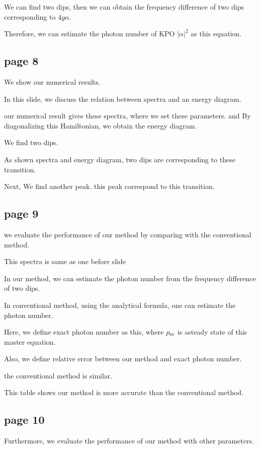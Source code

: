 {{We can find two dips, then we can obtain the frequency difference of two dips corresponding to $4g\alpha$.

Therefore, we can estimate the photon number of KPO $|\alpha|^2$ as this equation.



\subsection{page 8}
We show our numerical results.

In this slide, we discuss the relation between spectra and an energy diagram.

our numerical result gives these spectra, where we set these parameters.
and By diagonalizing this Hamiltonian, we obtain the energy diagram.

We find two dips.

As shown spectra and energy diagram, two dips are corresponding to these transition.

Next, We find another peak.
this peak correspond to this transition.




\subsection{page 9}
we evaluate the performance of our method by comparing with the conventional method.


This spectra is same as one before slide

In our method, we can estimate the photon number  from the frequency difference of two dips.

In conventional method, using the analytical formula, one can estimate the photon number.

Here, we define exact photon number as this, where $\rho_{\rm{ss}}$ is asteady state of this master equation.

Also, we define relative error between our method and exact photon number.

the conventional method is similar.

This table shows our method is more accurate than the conventional method.



\subsection{page 10}
Furthermore, we evaluate the performance of our method with other parameters.

}}
